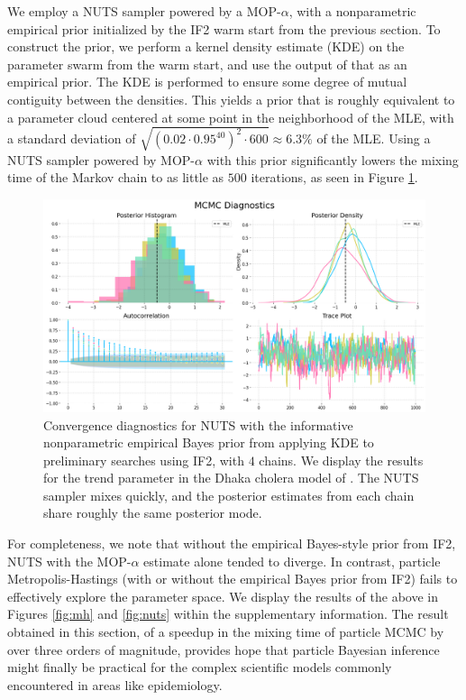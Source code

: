 \documentclass[9pt,twocolumn,pnasresearcharticle]{pnas-new}
\newcommand\arxiv[2]{#2} %
\begin{document}
We employ a NUTS sampler powered by a MOP-$\alpha$, with a nonparametric empirical prior initialized by the IF2 warm start from the previous section.
To construct the prior, we perform a kernel density estimate (KDE) on the parameter swarm from the warm start, and use the output of that as an empirical prior.
The KDE is performed to ensure some degree of mutual contiguity between the densities.
This yields a prior that is roughly equivalent to a parameter cloud centered at some point in the neighborhood of the MLE, with a standard deviation of $\sqrt{(0.02\cdot0.95^{40})^2 \cdot 600}\approx 6.3\%$ of the MLE.
Using a NUTS sampler powered by MOP-$\alpha$ with this prior significantly lowers the mixing time of the Markov chain to as little as $500$ iterations, as seen in Figure \ref{fig:nuts-eb}. 

\begin{figure}[t!]
    \centering
    \includegraphics[width=\arxiv{\textwidth/\real{1.25}}{\textwidth/\real{2.5}}]{imgs/pmcmc/nuts_eb.png}
    \caption{Convergence diagnostics for NUTS with the informative nonparametric empirical Bayes prior from applying KDE to preliminary searches using IF2, with $4$ chains. We display the results for the trend parameter in the Dhaka cholera model of \cite{king08}. The NUTS sampler mixes quickly, and the posterior estimates from each chain share roughly the same posterior mode.}
    \label{fig:nuts-eb}
\end{figure}

For completeness, we note that without the empirical Bayes-style prior from IF2, NUTS with the MOP-$\alpha$ estimate alone tended to diverge.
In contrast, particle Metropolis-Hastings (with or without the empirical Bayes prior from IF2) fails to effectively explore the parameter space.
We display the results of the above in Figures \ref{fig:mh} and \ref{fig:nuts} \arxiv{in Appendix~\ref{appendix:bayes}}{within the supplementary information}. 
The result obtained in this section, of a speedup in the mixing time of particle MCMC by over three orders of magnitude, provides hope that particle Bayesian inference might finally be practical for the complex scientific models commonly encountered in areas like epidemiology.
\end{document}
